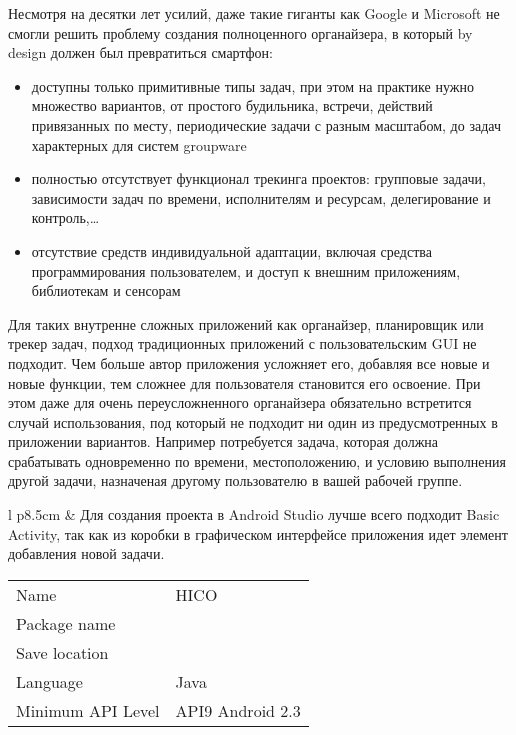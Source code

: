 \noindent
Несмотря на десятки лет усилий, даже такие гиганты как Google и Microsoft не
смогли решить проблему создания полноценного органайзера, в который by design
должен был превратиться смартфон:
\begin{itemize}
  \item доступны только примитивные типы задач, при этом на практике нужно
  множество вариантов, от простого будильника, встречи, действий привязанных по
  месту, периодические задачи с разным масштабом, до задач характерных для систем
  groupware
  \item полностью отсутствует функционал трекинга проектов: групповые
  задачи, зависимости задач по времени, исполнителям и ресурсам, делегирование и
  контроль,\ldots
  \item отсутствие средств индивидуальной адаптации, включая средства
  программирования пользователем, и доступ к внешним приложениям, библиотекам и
  сенсорам
\end{itemize}

\noindent
Для таких внутренне сложных приложений как органайзер, планировщик или трекер
задач, подход традиционных приложений с пользовательским GUI не подходит. Чем
больше автор приложения усложняет его, добавляя все новые и новые функции, тем
сложнее для пользователя становится его освоение. При этом даже для
очень переусложненного органайзера обязательно встретится случай использования,
под который не подходит ни один из предусмотренных в приложении вариантов.
Например потребуется задача, которая должна срабатывать одновременно по времени,
местоположению, и условию выполнения другой задачи, назначеная другому
пользователю в вашей рабочей группе.

\noindent
\begin{tabular}{l p{8.5cm}}
 &
Для создания проекта в Android Studio лучше всего подходит Basic Activity, так
как из коробки в графическом интерфейсе приложения идет элемент добавления новой
задачи.

\medskip
\begin{tabular}{l l}
Name & HICO \\
Package name & \file{io.github.ponyatov.hico} \\
Save location & \file{/home/ponyatov/hico/Android} \\
Language & Java \\
Minimum API Level & API9 Android 2.3 \\
\end{tabular}
\\
\end{tabular}


\secup
